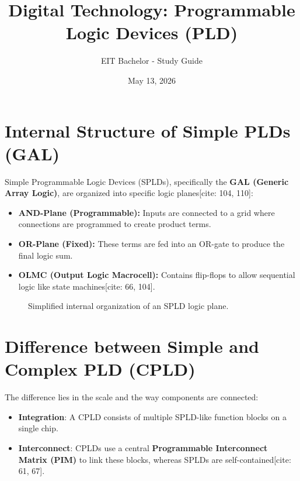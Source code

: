 \documentclass[12pt,a4paper]{article}
\title{Digital Technology: Programmable Logic Devices (PLD)}
\author{EIT Bachelor - Study Guide}
\date{May 13, 2026}
\begin{document}
\maketitle

\section{Internal Structure of Simple PLDs (GAL)}
Simple Programmable Logic Devices (SPLDs), specifically the \textbf{GAL (Generic Array Logic)}, are organized into specific logic planes[cite: 104, 110]:

\begin{itemize}
    \item \textbf{AND-Plane (Programmable):} Inputs are connected to a grid where connections are programmed to create product terms.
    \item \textbf{OR-Plane (Fixed):} These terms are fed into an OR-gate to produce the final logic sum.
    \item \textbf{OLMC (Output Logic Macrocell):} Contains flip-flops to allow sequential logic like state machines[cite: 66, 104].
\end{itemize}

\begin{figure}[ht]
\centering
{}
\caption{Simplified internal organization of an SPLD logic plane.}
\end{figure}

\section{Difference between Simple and Complex PLD (CPLD)}
The difference lies in the scale and the way components are connected:
\begin{itemize}
    \item \textbf{Integration}: A CPLD consists of multiple SPLD-like function blocks on a single chip.
    \item \textbf{Interconnect}: CPLDs use a central \textbf{Programmable Interconnect Matrix (PIM)} to link these blocks, whereas SPLDs are self-contained[cite: 61, 67].
\end{itemize}
\end{document}
